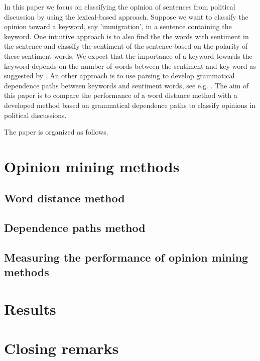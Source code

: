 \documentclass[a4paper, 12pt]{article}
\begin{document}
In this paper we focus on classifying the opinion of sentences from political discussion by using the lexical-based approach. Suppose we want to classify the opinion toward a keyword, say 'immigration', in a sentence containing the keyword. One intuitive approach is to also find the the words with sentiment in the sentence and classify the sentiment of the sentence based on the polarity of these sentiment words. We expect that the importance of a keyword towards the keyword depends on the number of words between the sentiment and key word as suggested by \citet{Ding08}. An other approach is to use parsing to develop grammatical dependence paths between keywords and sentiment words, see e.g. \citet{Jiang11}. The aim of this paper is to compare the performance of a word distance method \citep{Ding08} with a developed method based on grammatical dependence paths to classify opinions in political discussions.

The paper is organized as follows. 

\section{Opinion mining methods}
\label{sec:om}

\subsection{Word distance method}
\label{sec:wd}

\subsection{Dependence paths method}
\label{sec:dp}

\subsection{Measuring the performance of opinion mining methods}
\label{sec:diff}

\section{Results}
\label{sec:results}

\section{Closing remarks}
\label{sec:cr}


\end{document}
